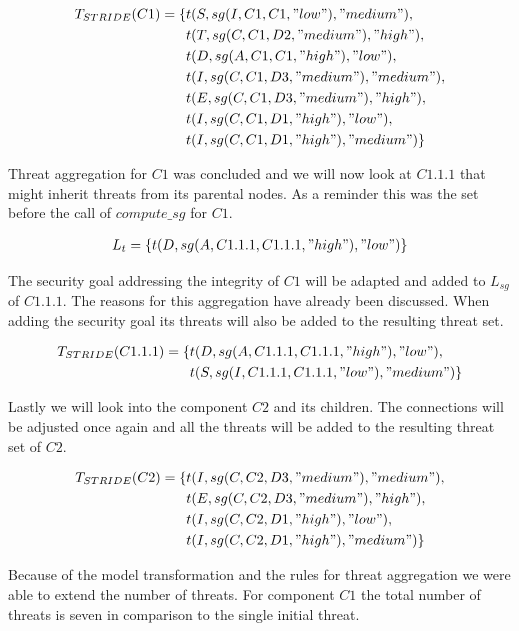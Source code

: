 \begin{align*}
T_{STRIDE}(C1) = \{&t(S, sg(I,C1,C1,"low"), "medium"), \\
&t(T, sg(C,C1,D2,"medium"), "high"), \\
&t(D, sg(A,C1,C1,"high"), "low"), \\
&t(I, sg(C,C1,D3,"medium"), "medium"), \\
&t(E, sg(C,C1,D3,"medium"), "high"), \\
&t(I, sg(C,C1,D1,"high"), "low"), \\
&t(I, sg(C,C1,D1,"high"), "medium")
\}
\end{align*}

Threat aggregation for $C1$ was concluded and we will now look at $C1.1.1$ that might inherit threats from its parental nodes. As a reminder this was the set before the call of $compute\_sg$ for $C1$.

\begin{align*}
L_t = \{t(D, sg(A,C1.1.1,C1.1.1,"high"), "low")\}
\end{align*}

The security goal addressing the integrity of $C1$ will be adapted and added to $L_{sg}$ of $C1.1.1$. The reasons for this aggregation have already been discussed. When adding the security goal its threats will also be added to the resulting threat set.

\begin{align*}
T_{STRIDE}(C1.1.1) = \{&t(D, sg(A,C1.1.1,C1.1.1,"high"), "low"), \\
&t(S, sg(I,C1.1.1,C1.1.1,"low"), "medium")\}
\end{align*}

Lastly we will look into the component $C2$ and its children. The connections will be adjusted once again and all the threats will be added to the resulting threat set of $C2$. 

\begin{align*}
T_{STRIDE}(C2) = \{&t(I, sg(C,C2,D3,"medium"), "medium"), \\
&t(E, sg(C,C2,D3,"medium"), "high"), \\
&t(I, sg(C,C2,D1,"high"), "low"), \\
&t(I, sg(C,C2,D1,"high"), "medium")
\}
\end{align*}

Because of the model transformation and the rules for threat aggregation we were able to extend the number of threats. For component $C1$ the total number of threats is seven in comparison to the single initial threat.

